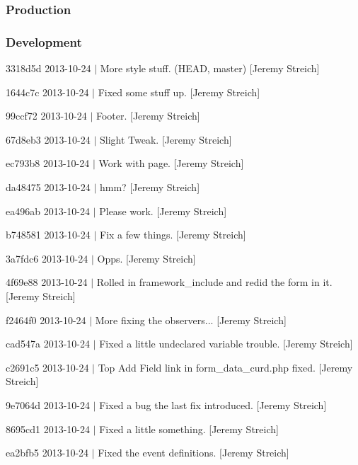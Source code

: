\subsubsection*{Production}

\subsubsection*{Development}


\begin{DoxyItemize}
\item 3318d5d 2013-\/10-\/24 $|$ More style stuff. (H\-E\-A\-D, master) \mbox{[}Jeremy Streich\mbox{]}
\item 1644c7c 2013-\/10-\/24 $|$ Fixed some stuff up. \mbox{[}Jeremy Streich\mbox{]}
\item 99ccf72 2013-\/10-\/24 $|$ Footer. \mbox{[}Jeremy Streich\mbox{]}
\item 67d8eb3 2013-\/10-\/24 $|$ Slight Tweak. \mbox{[}Jeremy Streich\mbox{]}
\item ec793b8 2013-\/10-\/24 $|$ Work with page. \mbox{[}Jeremy Streich\mbox{]}
\item da48475 2013-\/10-\/24 $|$ hmm? \mbox{[}Jeremy Streich\mbox{]}
\item ea496ab 2013-\/10-\/24 $|$ Please work. \mbox{[}Jeremy Streich\mbox{]}
\item b748581 2013-\/10-\/24 $|$ Fix a few things. \mbox{[}Jeremy Streich\mbox{]}
\item 3a7fdc6 2013-\/10-\/24 $|$ Opps. \mbox{[}Jeremy Streich\mbox{]}
\item 4f69e88 2013-\/10-\/24 $|$ Rolled in framework\-\_\-include and redid the form in it. \mbox{[}Jeremy Streich\mbox{]}
\item f2464f0 2013-\/10-\/24 $|$ More fixing the observers... \mbox{[}Jeremy Streich\mbox{]}
\item cad547a 2013-\/10-\/24 $|$ Fixed a little undeclared variable trouble. \mbox{[}Jeremy Streich\mbox{]}
\item c2691c5 2013-\/10-\/24 $|$ Top Add Field link in form\-\_\-data\-\_\-curd.\-php fixed. \mbox{[}Jeremy Streich\mbox{]}
\item 9e7064d 2013-\/10-\/24 $|$ Fixed a bug the last fix introduced. \mbox{[}Jeremy Streich\mbox{]}
\item 8695cd1 2013-\/10-\/24 $|$ Fixed a little something. \mbox{[}Jeremy Streich\mbox{]}
\item ea2bfb5 2013-\/10-\/24 $|$ Fixed the event definitions. \mbox{[}Jeremy Streich\mbox{]}

\end{DoxyItemize}

